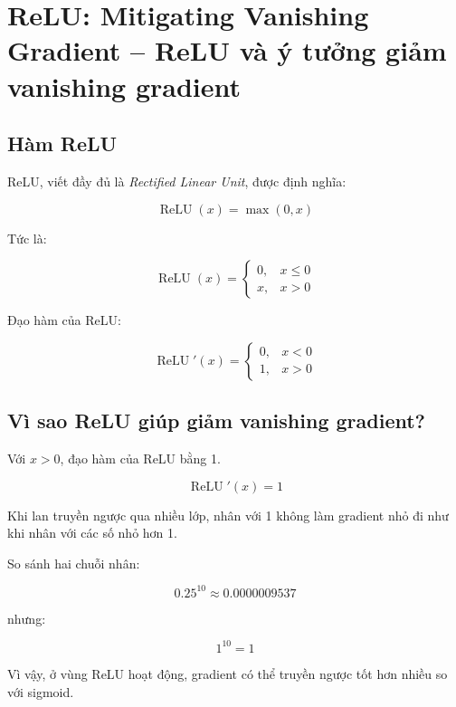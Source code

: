\section{ReLU: Mitigating Vanishing Gradient -- ReLU và ý tưởng giảm vanishing gradient}

\subsection{Hàm ReLU}

ReLU, viết đầy đủ là \textit{Rectified Linear Unit}, được định nghĩa:

\[
    \operatorname{ReLU}(x)=\max(0,x)
\]

Tức là:

\[
    \operatorname{ReLU}(x)=
    \begin{cases}
    0, & x\leq 0\\
    x, & x>0
    \end{cases}
\]

Đạo hàm của ReLU:

\[
    \operatorname{ReLU}'(x)=
    \begin{cases}
    0, & x<0\\
    1, & x>0
    \end{cases}
\]

\begin{center}
\end{center}

\subsection{Vì sao ReLU giúp giảm vanishing gradient?}

Với $x>0$, đạo hàm của ReLU bằng 1.

\[
    \operatorname{ReLU}'(x)=1
\]

Khi lan truyền ngược qua nhiều lớp, nhân với 1 không làm gradient nhỏ đi như khi nhân với các số nhỏ hơn 1.

\begin{vidu}
So sánh hai chuỗi nhân:

\[
    0.25^{10}\approx 0.0000009537
\]

nhưng:

\[
    1^{10}=1
\]

Vì vậy, ở vùng ReLU hoạt động, gradient có thể truyền ngược tốt hơn nhiều so với sigmoid.
\end{vidu}

